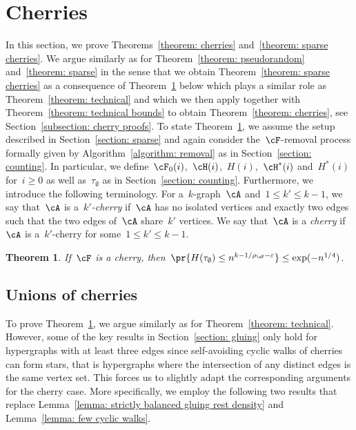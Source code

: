 \documentclass[11pt]{amsart}
\newcommand{\eps}{\varepsilon}
\newtheorem{theorem}[algocf]{Theorem}
\theoremstyle{definition}
\numberwithin{equation}{section}
\begin{document}
	\section{Cherries}\label{appendix: cherries}
	In this section, we prove Theorems~\ref{theorem: cherries} and~\ref{theorem: sparse cherries}.
	We argue similarly as for Theorem~\ref{theorem: pseudorandom} and~\ref{theorem: sparse} in the sense that we obtain Theorem~\ref{theorem: sparse cherries} as a consequence of Theorem~\ref{theorem: technical cherries} below which plays a similar role as Theorem~\ref{theorem: technical} and which we then apply together with Theorem~\ref{theorem: technical bounds} to obtain Theorem~\ref{theorem: cherries}, see Section~\ref{subsection: cherry proofs}.
	To state Theorem~\ref{theorem: technical cherries}, we assume the setup described in Section~\ref{section: sparse} and again consider the~$\cF$-removal process formally given by Algorithm~\ref{algorithm: removal} as in Section~\ref{section: counting}.
	In particular, we define~$\cF_0(i)$,~$\cH(i)$,~$H(i)$,~$\cH^*(i)$ and~$H^*(i)$ for~$i\geq 0$ as well as~$\tau_\emptyset$ as in Section~\ref{section: counting}. 
	Furthermore, we introduce the following terminology.
	For a~$k$-graph~$\cA$ and~$1\leq k'\leq k-1$, we say that~$\cA$ is a~\emph{$k'$-cherry} if~$\cA$ has no isolated vertices and exactly two edges such that the two edges of~$\cA$ share~$k'$ vertices.
	We say that~$\cA$ is a \emph{cherry} if~$\cA$ is a~$k'$-cherry for some~$1\leq k'\leq k-1$.
	
	\begin{theorem}\label{theorem: technical cherries}
		If~$\cF$ is a cherry, then~$\pr{H(\tau_\emptyset)\leq n^{k-1/\rho_\cF-\eps}}\leq \exp(-n^{1/4})$.
	\end{theorem}
	
	\subsection{Unions of cherries}
	To prove Theorem~\ref{theorem: technical cherries}, we argue similarly as for Theorem~\ref{theorem: technical}.
	However, some of the key results in Section~\ref{section: gluing} only hold for hypergraphs with at least three edges since self-avoiding cyclic walks of cherries can form stars, that is hypergraphs where the intersection of any distinct edges is the same vertex set.
	This forces us to slightly adapt the corresponding arguments for the cherry case.
	More specifically, we employ the following two results that replace Lemma~\ref{lemma: strictly balanced gluing rest density} and Lemma~\ref{lemma: few cyclic walks}.
	
\end{document}
